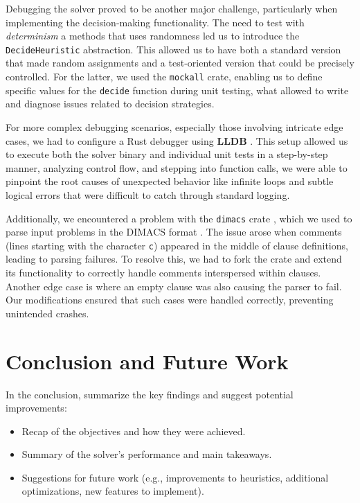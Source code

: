 \documentclass[a4paper,12pt]{article}
\begin{document}
Debugging the solver proved to be another major challenge, particularly when implementing the
decision-making functionality. The need to test with \textit{determinism} a methods that uses
randomness led us to introduce the \texttt{DecideHeuristic} abstraction. This allowed us to
have both a standard version that made random assignments and a test-oriented version that could
be precisely controlled. For the latter, we used the \texttt{mockall} crate, enabling us to
define specific values for the \texttt{decide} function during unit testing, what allowed to
write and diagnose issues related to decision strategies.

For more complex debugging scenarios, especially those involving intricate edge cases, we had
to configure a Rust debugger using \textbf{LLDB} \cite{LLDB}. This setup allowed us to execute
both the solver binary and individual unit tests in a step-by-step manner, analyzing control flow,
and stepping into function calls, we were able to pinpoint the root causes of unexpected behavior
like infinite loops and subtle logical errors that were difficult to catch through standard logging.

Additionally, we encountered a problem with the \texttt{dimacs} crate \cite{DimacsCrate}, which
we used to parse input problems in the DIMACS format \cite{DimacsFormat}. The issue arose when
comments (lines starting with the character \texttt{c}) appeared in the middle of clause definitions,
leading to parsing failures.
To resolve this, we had to fork the crate and extend its functionality to correctly handle comments
interspersed within clauses. Another edge case is where an empty clause was also causing the parser
to fail. Our modifications ensured that such cases were handled correctly, preventing unintended
crashes.


\section{Conclusion and Future Work}
\label{sec:conclusion}
In the conclusion, summarize the key findings and suggest potential improvements:
\begin{itemize}
    \item Recap of the objectives and how they were achieved.
    \item Summary of the solver’s performance and main takeaways.
    \item Suggestions for future work (e.g., improvements to heuristics, additional optimizations, new features to implement).
\end{itemize}
\end{document}
